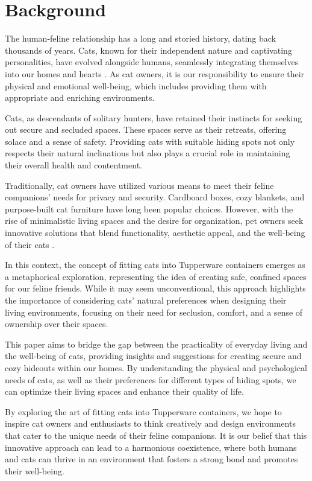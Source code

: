 \section{Background}
The human-feline relationship has a long and storied history, dating back thousands of years. Cats, known for their independent nature and captivating personalities, have evolved alongside humans, seamlessly integrating themselves into our homes and hearts \cite{wiki:cat}. As cat owners, it is our responsibility to ensure their physical and emotional well-being, which includes providing them with appropriate and enriching environments.

Cats, as descendants of solitary hunters, have retained their instincts for seeking out secure and secluded spaces. These spaces serve as their retreats, offering solace and a sense of safety. Providing cats with suitable hiding spots not only respects their natural inclinations but also plays a crucial role in maintaining their overall health and contentment.

Traditionally, cat owners have utilized various means to meet their feline companions' needs for privacy and security. Cardboard boxes, cozy blankets, and purpose-built cat furniture have long been popular choices. However, with the rise of minimalistic living spaces and the desire for organization, pet owners seek innovative solutions that blend functionality, aesthetic appeal, and the well-being of their cats \cite{tupperware:catcontainer}.

In this context, the concept of fitting cats into Tupperware containers emerges as a metaphorical exploration, representing the idea of creating safe, confined spaces for our feline friends. While it may seem unconventional, this approach highlights the importance of considering cats' natural preferences when designing their living environments, focusing on their need for seclusion, comfort, and a sense of ownership over their spaces.

This paper aims to bridge the gap between the practicality of everyday living and the well-being of cats, providing insights and suggestions for creating secure and cozy hideouts within our homes. By understanding the physical and psychological needs of cats, as well as their preferences for different types of hiding spots, we can optimize their living spaces and enhance their quality of life.

By exploring the art of fitting cats into Tupperware containers, we hope to inspire cat owners and enthusiasts to think creatively and design environments that cater to the unique needs of their feline companions. It is our belief that this innovative approach can lead to a harmonious coexistence, where both humans and cats can thrive in an environment that fosters a strong bond and promotes their well-being.
